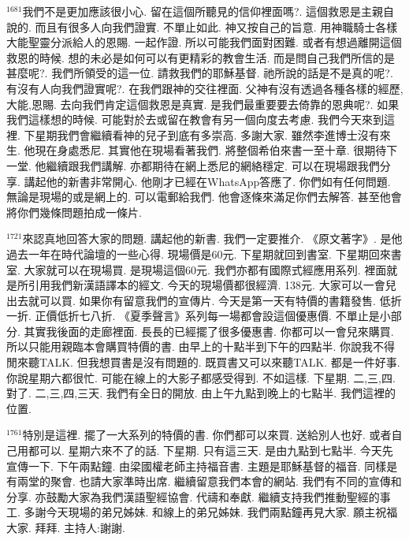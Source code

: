 \documentclass{book}
\begin{document}
$^{1681}$我們不是更加應該很小心.
留在這個所聽見的信仰裡面嗎?.
這個救恩是主親自說的.
而且有很多人向我們證實.
不單止如此.
神又按自己的旨意.
用神職騎士各樣大能聖靈分派給人的恩賜.
一起作證.
所以可能我們面對困難.
或者有想過離開這個救恩的時候.
想的未必是如何可以有更精彩的教會生活.
而是問自己我們所信的是甚麼呢?.
我們所領受的這一位.
請救我們的耶穌基督.
祂所說的話是不是真的呢?.
有沒有人向我們證實呢?.
在我們跟神的交往裡面.
父神有沒有透過各種各樣的經歷,大能,恩賜.
去向我們肯定這個救恩是真實.
是我們最重要要去倚靠的恩典呢?.
如果我們這樣想的時候.
可能對於去或留在教會有另一個向度去考慮.
我們今天來到這裡.
下星期我們會繼續看神的兒子到底有多崇高.
多謝大家.
雖然李進博士沒有來生.
他現在身處悉尼.
其實他在現場看著我們.
將整個希伯來書一至十章.
很期待下一堂.
他繼續跟我們講解.
亦都期待在網上悉尼的網絡穩定.
可以在現場跟我們分享.
講起他的新書非常開心.
他剛才已經在WhatsApp答應了.
你們如有任何問題.
無論是現場的或是網上的.
可以電郵給我們.
他會逐條來滿足你們去解答.
甚至他會將你們幾條問題拍成一條片.

$^{1721}$來認真地回答大家的問題.
講起他的新書.
我們一定要推介.
《原文著字》.
是他過去一年在時代論壇的一些心得.
現場價是60元.
下星期就回到書室.
下星期回來書室.
大家就可以在現場買.
是現場這個60元.
我們亦都有國際式經應用系列.
裡面就是所引用我們新漢語譯本的經文.
今天的現場價都很經濟.
138元.
大家可以一會兒出去就可以買.
如果你有留意我們的宣傳片.
今天是第一天有特價的書籍發售.
低折一折.
正價低折七八折.
《夏季聲言》系列每一場都會設這個優惠價.
不單止是小部分.
其實我後面的走廊裡面.
長長的已經擺了很多優惠書.
你都可以一會兒來購買.
所以只能用親臨本會購買特價的書.
由早上的十點半到下午的四點半.
你說我不得閒來聽TALK.
但我想買書是沒有問題的.
既買書又可以來聽TALK.
都是一件好事.
你說星期六都很忙.
可能在線上的大影子都感受得到.
不如這樣.
下星期.
二,三,四.
對了.
二,三,四,三天.
我們有全日的開放.
由上午九點到晚上的七點半.
我們這裡的位置.

$^{1761}$特別是這裡.
擺了一大系列的特價的書.
你們都可以來買.
送給別人也好.
或者自己用都可以.
星期六來不了的話.
下星期.
只有這三天.
是由九點到七點半.
今天先宣傳一下.
下午兩點鐘.
由梁國權老師主持福音書.
主題是耶穌基督的福音.
同樣是有兩堂的聚會.
也請大家準時出席.
繼續留意我們本會的網站.
我們有不同的宣傳和分享.
亦鼓勵大家為我們漢語聖經協會.
代禱和奉獻.
繼續支持我們推動聖經的事工.
多謝今天現場的弟兄姊妹.
和線上的弟兄姊妹.
我們兩點鐘再見大家.
願主祝福大家.
拜拜.
主持人:謝謝.
\newpage
\end{document}
